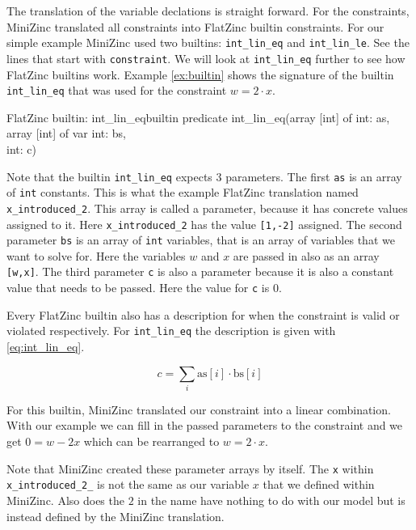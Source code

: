 The translation of the variable declations is straight forward. For the constraints, MiniZinc translated all constraints into FlatZinc builtin constraints. For our simple example MiniZinc used two builtins: \verb|int_lin_eq| and \verb|int_lin_le|. See the lines that start with \verb|constraint|. We will look at \verb|int_lin_eq| further to see how FlatZinc builtins work. Example \ref{ex:builtin} shows the signature of the builtin \verb|int_lin_eq| that was used for the constraint $w = 2 \cdot x$. \\

\begin{example}{FlatZinc builtin: int\_lin\_eq}{builtin}
	predicate int\_lin\_eq(array [int] of int: as,\\
	\null \hspace*{2.95cm} array [int] of var int: bs,\\
	\null \hspace*{2.95cm} int: c)
\end{example}

Note that the builtin \verb|int_lin_eq| expects 3 parameters. The first \verb|as| is an array of \verb|int| constants. This is what the example FlatZinc translation named \verb|x_introduced_2|. This array is called a parameter, because it has concrete values assigned to it. Here \verb|x_introduced_2| has the value \verb|[1,-2]| assigned. The second parameter \verb|bs| is an array of \verb|int| variables, that is an array of variables that we want to solve for. Here the variables $w$ and $x$ are passed in also as an array \verb|[w,x]|. The third parameter \verb|c| is also a parameter because it is also a constant value that needs to be passed. Here the value for \verb|c| is $0$.

Every FlatZinc builtin also has a description for when the constraint is valid or violated respectively. For \verb|int_lin_eq| the description is given with \cref{eq:int_lin_eq}.

\begin{equation} \label{eq:int_lin_eq}
	c = \sum_{i} \text{as}[i] \cdot \text{bs}[i]
\end{equation}

For this builtin, MiniZinc translated our constraint into a linear combination. With our example we can fill in the passed parameters to the constraint and we get $0 = w - 2x$ which can be rearranged to $w = 2 \cdot x$.

Note that MiniZinc created these parameter arrays by itself. The \verb|x| within \verb|x_introduced_2_| is not the same as our variable $x$ that we defined within MiniZinc. Also does the $2$ in the name have nothing to do with our model but is instead defined by the MiniZinc translation.

